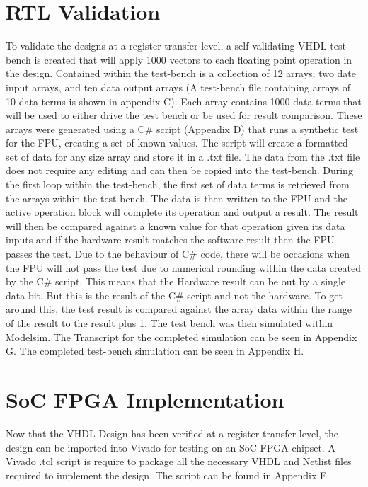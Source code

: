 \documentclass[conference]{IEEEtran}
\begin{document}
\section{RTL Validation}
To validate the designs at a register transfer level, a self-validating VHDL test bench is created that will apply 1000 vectors to each floating point operation in the design. Contained within the test-bench is a collection of 12 arrays; two date input arrays, and ten data output arrays (A test-bench file containing arrays of 10 data terms is shown in appendix C). Each array contains 1000 data terms that will be used to either drive the test bench or be used for result comparison. These arrays were generated using a C\# script (Appendix D) that runs a synthetic test for the FPU, creating a set of known values. The script will create a formatted set of data for any size array and store it in a .txt file. The data from the .txt file does not require any editing and can then be copied into the test-bench. During the first loop within the test-bench, the first set of data terms is retrieved from the arrays within the test bench. The data is then written to the FPU and the active operation block will complete its operation and output a result. The result will then be compared against a known value for that operation given its data inputs and if the hardware result matches the software result then the FPU passes the test. Due to the behaviour of C\# code, there will be occasions when the FPU will not pass the test due to numerical rounding within the data created by the C\# script. This means that the Hardware result can be out by a single data bit. But this is the result of the C\# script and not the hardware. To get around this, the test result is compared against the array data within the range of the result to the result plus 1.  The test bench was then simulated within Modelsim. The Transcript for the completed simulation can be seen in Appendix G. The completed test-bench simulation can be seen in Appendix H. 


\section{SoC FPGA Implementation}
Now that the VHDL Design has been verified at a register transfer level, the design can be imported into Vivado for testing on an SoC-FPGA chipset. A Vivado .tcl script is require to package all the necessary VHDL and Netlist files required to implement the design. The script can be found in Appendix E.
\newline
\end{document}
